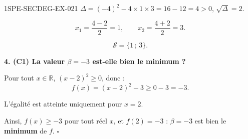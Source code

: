 \begin{corrige}{1SPE-SECDEG-EX-021}
$\Delta = (-4)^2 - 4 \times 1 \times 3 = 16 - 12 = 4 > 0$, $\sqrt{\Delta} = 2$.

\[x_1 = \frac{4 - 2}{2} = 1, \qquad x_2 = \frac{4 + 2}{2} = 3.\]

\[\boxed{\mathcal{S} = \{1\,;\,3\}.}\]

\medskip
\textbf{4. (C1) La valeur $\beta = -3$ est-elle bien le minimum ?}


Pour tout $x \in \mathbb{R}$, $(x-2)^2 \geqslant 0$, donc :
\[f(x) = (x-2)^2 - 3 \geqslant 0 - 3 = -3.\]

L'égalité est atteinte uniquement pour $x = 2$.

Ainsi, $f(x) \geqslant -3$ pour tout réel $x$, et $f(2) = -3$ : $\beta = -3$ est bien le \textbf{minimum} de $f$. \hfill $\square$

\end{corrige}
